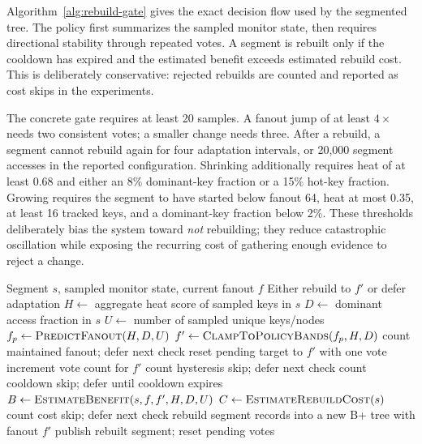 \documentclass[sigconf,review,anonymous]{acmart}
\begin{document}
Algorithm~\ref{alg:rebuild-gate} gives the exact decision flow used by the
segmented tree.  The policy first summarizes the sampled monitor state, then
requires directional stability through repeated votes.  A segment is rebuilt
only if the cooldown has expired and the estimated benefit exceeds estimated
rebuild cost.  This is deliberately conservative: rejected rebuilds are
counted and reported as cost skips in the experiments.

The concrete gate requires at least 20 samples.  A fanout jump of at least
\(4\times\) needs two consistent votes; a smaller change needs three.  After a
rebuild, a segment cannot rebuild again for four adaptation intervals, or
20,000 segment accesses in the reported configuration.  Shrinking additionally
requires heat of at least 0.68 and either an 8\% dominant-key fraction or a
15\% hot-key fraction.  Growing requires the segment to have started below
fanout 64, heat at most 0.35, at least 16 tracked keys, and a dominant-key
fraction below 2\%.  These thresholds deliberately bias the system toward
\emph{not} rebuilding; they reduce catastrophic oscillation while exposing
the recurring cost of gathering enough evidence to reject a change.

\begin{algorithm}[t]
\caption{Cost-aware fanout rebuild gate}
\label{alg:rebuild-gate}
\begin{algorithmic}[1]
\Require Segment $s$, sampled monitor state, current fanout $f$
\Ensure Either rebuild to $f'$ or defer adaptation
\State $H \gets$ aggregate heat score of sampled keys in $s$
\State $D \gets$ dominant access fraction in $s$
\State $U \gets$ number of sampled unique keys/nodes
\State $f_p \gets \textsc{PredictFanout}(H,D,U)$
\State $f' \gets \textsc{ClampToPolicyBands}(f_p,H,D)$
  \State count maintained fanout; defer next check
  \State \Return
\EndIf
{}
  \State reset pending target to $f'$ with one vote
\Else
  \State increment vote count for $f'$
\EndIf
{}
  \State count hysteresis skip; defer next check
  \State \Return
\EndIf
{}
  \State count cooldown skip; defer until cooldown expires
  \State \Return
\EndIf
\State $B \gets \textsc{EstimateBenefit}(s,f,f',H,D,U)$
\State $C \gets \textsc{EstimateRebuildCost}(s)$
  \State count cost skip; defer next check
  \State \Return
\EndIf
\State rebuild segment records into a new B+ tree with fanout $f'$
\State publish rebuilt segment; reset pending votes
\end{algorithmic}
\end{algorithm}
\end{document}
